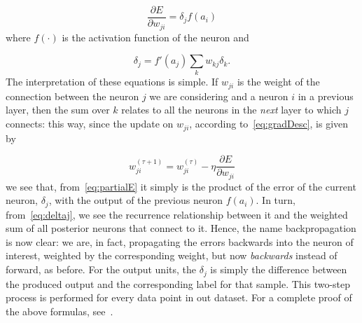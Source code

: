 \begin{equation}\label{eq:partialE}
	\frac{\partial E}{\partial w_{ji}} = \delta_j f(a_i)
\end{equation}
where $f(\cdot)$ is the activation function of the neuron and

\begin{equation}\label{eq:deltaj}
	\delta_j = f'(a_j) \sum_k w_{kj} \delta_k .
\end{equation}
The interpretation of these equations is simple. If $w_{ji}$ is the weight of the connection between the neuron $j$ we are considering and a neuron $i$ in a previous layer, then the sum over $k$ relates to all the neurons in the \emph{next} layer to which $j$ connects: this way, since the update on $w_{ji}$, according to~\ref{eq:gradDesc}, is given by

\begin{equation}\label{eq:update}
	w_{ji}^{(\tau+1)} = w_{ji}^{(\tau)} - \eta \frac{\partial E}{\partial w_{ji}}
\end{equation}
we see that, from~\ref{eq:partialE}  it simply is the product of the error of the current neuron, $\delta_j$, with the output of the previous neuron $f(a_i)$. In turn, from~\ref{eq:deltaj}, we see the recurrence relationship between it and the weighted sum of all posterior neurons that connect to it. Hence, the name backpropagation is now clear: we are, in fact, propagating the errors backwards into the neuron of interest, weighted by the corresponding weight, but now \emph{backwards} instead of forward, as before. For the output units, the $\delta_j$ is simply the difference between the produced output and the corresponding label for that sample. This two-step process is performed for every data point in out dataset. %
For a complete proof of the above formulas, see~\cite[chap. 5.3.1]{Bishop2006}.

